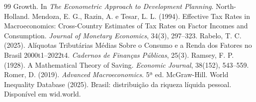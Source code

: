 \documentclass[11pt,a4paper]{article}
\begin{document}
\begin{thebibliography}{99}
Growth. In \emph{The Econometric Approach to Development Planning}.
North-Holland.
 Mendoza, E. G., Razin, A. e Tesar, L. L. (1994). Effective Tax
Rates in Macroeconomics: Cross-Country Estimates of Tax Rates on Factor Incomes
and Consumption. \emph{Journal of Monetary Economics}, 34(3), 297--323.
 Rabelo, T. C. (2025). Alíquotas Tributárias Médias Sobre o
Consumo e a Renda dos Fatores no Brasil 2000t1--2022t4. \emph{Cadernos de
Finanças Públicas}, 25(3).
 Ramsey, F. P. (1928). A Mathematical Theory of Saving.
\emph{Economic Journal}, 38(152), 543--559.
 Romer, D. (2019). \emph{Advanced Macroeconomics}. 5ª ed.
McGraw-Hill.
 World Inequality Database (2025). Brasil: distribuição da
riqueza líquida pessoal. Disponível em wid.world.
\end{thebibliography}
\end{document}
